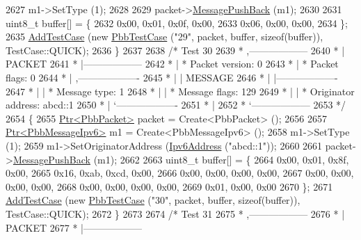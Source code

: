 \begin{DoxyCode}
2627     m1->SetType (1);
2628 
2629     packet->\hyperlink{classns3_1_1PbbPacket_a4a3170001ef758d9c9c4375b8f089826}{MessagePushBack} (m1);
2630 
2631     uint8\_t buffer[] = \{
2632       0x00, 0x01, 0x0f, 0x00,
2633       0x06, 0x00, 0x00,
2634     \};
2635     \hyperlink{classns3_1_1TestCase_a3718088e3eefd5d6454569d2e0ddd835}{AddTestCase} (\textcolor{keyword}{new} \hyperlink{classPbbTestCase}{PbbTestCase} (\textcolor{stringliteral}{"29"}, packet, buffer, \textcolor{keyword}{sizeof}(buffer)), 
      TestCase::QUICK);
2636   \}
2637 
2638   \textcolor{comment}{/* Test 30}
2639 \textcolor{comment}{         * ,------------------}
2640 \textcolor{comment}{         * |  PACKET}
2641 \textcolor{comment}{         * |------------------}
2642 \textcolor{comment}{         * | * Packet version:    0}
2643 \textcolor{comment}{         * | * Packet flags:  0}
2644 \textcolor{comment}{         * |    ,-------------------}
2645 \textcolor{comment}{         * |    |  MESSAGE}
2646 \textcolor{comment}{         * |    |-------------------}
2647 \textcolor{comment}{         * |    | * Message type:       1}
2648 \textcolor{comment}{         * |    | * Message flags:  129}
2649 \textcolor{comment}{         * |    | * Originator address: abcd::1}
2650 \textcolor{comment}{         * |    `-------------------}
2651 \textcolor{comment}{         * |}
2652 \textcolor{comment}{         * `------------------}
2653 \textcolor{comment}{   */}
2654   \{
2655     \hyperlink{classns3_1_1Ptr}{Ptr<PbbPacket>} packet = Create<PbbPacket> ();
2656 
2657     \hyperlink{classns3_1_1Ptr}{Ptr<PbbMessageIpv6>} m1 = Create<PbbMessageIpv6> ();
2658     m1->SetType (1);
2659     m1->SetOriginatorAddress (\hyperlink{classns3_1_1Ipv6Address}{Ipv6Address} (\textcolor{stringliteral}{"abcd::1"}));
2660 
2661     packet->\hyperlink{classns3_1_1PbbPacket_a4a3170001ef758d9c9c4375b8f089826}{MessagePushBack} (m1);
2662 
2663     uint8\_t buffer[] = \{
2664       0x00, 0x01, 0x8f, 0x00,
2665       0x16, 0xab, 0xcd, 0x00,
2666       0x00, 0x00, 0x00, 0x00,
2667       0x00, 0x00, 0x00, 0x00,
2668       0x00, 0x00, 0x00, 0x00,
2669       0x01, 0x00, 0x00
2670     \};
2671     \hyperlink{classns3_1_1TestCase_a3718088e3eefd5d6454569d2e0ddd835}{AddTestCase} (\textcolor{keyword}{new} \hyperlink{classPbbTestCase}{PbbTestCase} (\textcolor{stringliteral}{"30"}, packet, buffer, \textcolor{keyword}{sizeof}(buffer)), 
      TestCase::QUICK);
2672   \}
2673 
2674   \textcolor{comment}{/* Test 31}
2675 \textcolor{comment}{         * ,------------------}
2676 \textcolor{comment}{         * |  PACKET}
2677 \textcolor{comment}{         * |------------------}

\end{DoxyCode}
